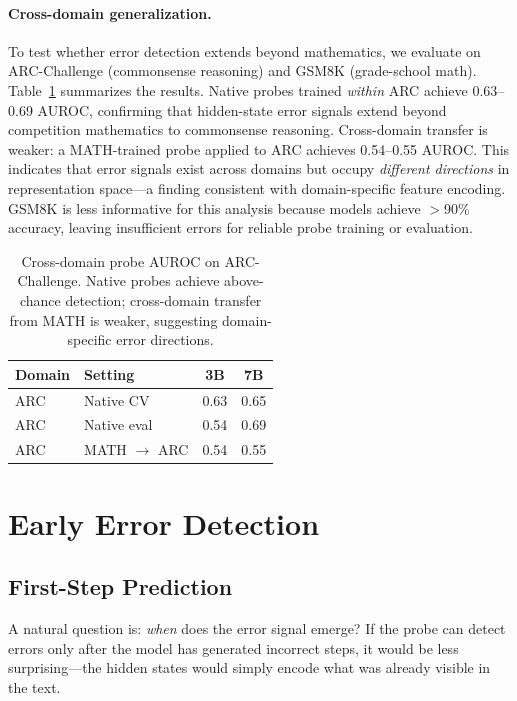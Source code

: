 \documentclass[11pt]{article}
\begin{document}
\paragraph{Cross-domain generalization.}
To test whether error detection extends beyond mathematics, we evaluate on ARC-Challenge \cite{clark2018arc} (commonsense reasoning) and GSM8K \cite{cobbe2021training} (grade-school math).
Table~\ref{tab:cross_domain} summarizes the results.
Native probes trained \textit{within} ARC achieve 0.63--0.69 AUROC, confirming that hidden-state error signals extend beyond competition mathematics to commonsense reasoning.
Cross-domain transfer is weaker: a MATH-trained probe applied to ARC achieves 0.54--0.55 AUROC.
This indicates that error signals exist across domains but occupy \textit{different directions} in representation space---a finding consistent with domain-specific feature encoding.
GSM8K is less informative for this analysis because models achieve $>$90\% accuracy, leaving insufficient errors for reliable probe training or evaluation.

\begin{table}[t]
\centering
\small
\begin{tabular}{llcc}
\toprule
\textbf{Domain} & \textbf{Setting} & \textbf{3B} & \textbf{7B} \\
\midrule
ARC & Native CV & 0.63 & 0.65 \\
ARC & Native eval & 0.54 & 0.69 \\
ARC & MATH $\to$ ARC & 0.54 & 0.55 \\
\bottomrule
\end{tabular}
\caption{Cross-domain probe AUROC on ARC-Challenge. Native probes achieve above-chance detection; cross-domain transfer from MATH is weaker, suggesting domain-specific error directions.}
\label{tab:cross_domain}
\end{table}

\section{Early Error Detection}
\label{sec:early}

\subsection{First-Step Prediction}

A natural question is: \textit{when} does the error signal emerge?
If the probe can detect errors only after the model has generated incorrect steps, it would be less surprising---the hidden states would simply encode what was already visible in the text.
\end{document}

